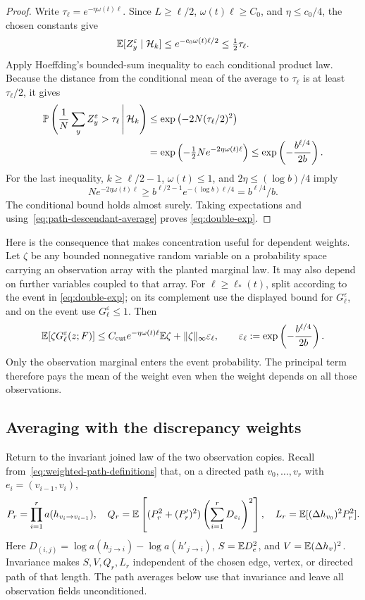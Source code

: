 \begin{proof}
Write $\tau_\ell=e^{-\eta\omega(t)\ell}$.  Since $L\ge\ell/2$,
$\omega(t)\ell\ge C_0$, and $\eta\le c_0/4$, the chosen constants
give
\[
 \E[Z_y^\varepsilon\mid\mathcal H_k]
       \le e^{-c_0\omega(t)\ell/2}\le\tfrac12\tau_\ell.
\]
Apply Hoeffding's bounded-sum inequality
\cite[Theorem~2]{Hoeffding1963} to each conditional product law.
Because the distance from the conditional mean of the average to
$\tau_\ell$ is at least $\tau_\ell/2$, it gives
\begin{align*}
 \P\left(\frac1N\sum_yZ_y^\varepsilon>\tau_\ell
              \,\middle|\,\mathcal H_k\right)
 &\le\exp\left(-2N(\tau_\ell/2)^2\right)\\
 &=\exp\left(-\tfrac12N e^{-2\eta\omega(t)\ell}\right)
 \le\exp\left(-\frac{b^{\ell/4}}{2b}\right).
\end{align*}
For the last inequality, $k\ge\ell/2-1$, $\omega(t)\le1$, and
$2\eta\le(\log b)/4$ imply
\[
 N e^{-2\eta\omega(t)\ell}
       \ge b^{\ell/2-1}e^{-(\log b)\ell/4}
       =b^{\ell/4}/b.
\]
The conditional bound holds almost surely.  Taking
expectations and using~\eqref{eq:path-descendant-average} proves
\eqref{eq:double-exp}.
\end{proof}

Here is the consequence that makes concentration useful for dependent
weights.  Let $\zeta$ be any bounded nonnegative random variable on a
probability space carrying an observation array with the planted
marginal law.  It may also depend on further variables coupled to that
array.  For $\ell\ge\ell_*(t)$, split according to the event in
\eqref{eq:double-exp}; on its complement use the displayed bound for
$G^\varepsilon_\ell$, and on the event use $G^\varepsilon_\ell\le1$.
Then
\begin{equation}
 \E[\zeta G^\varepsilon_\ell(z;F)]
 \le C_{\mathrm{cut}}e^{-\eta\omega(t)\ell}\E\zeta
       +\|\zeta\|_\infty\varepsilon_\ell,
 \qquad
 \varepsilon_\ell:=\exp\left(-\frac{b^{\ell/4}}{2b}\right).
 \label{eq:dependent-average-bound}
\end{equation}
Only the observation marginal enters the event probability.  The
principal term therefore pays the mean of the weight even when the
weight depends on all those observations.

\subsection{Averaging with the discrepancy weights}

Return to the invariant joined law of the two observation copies.
Recall from~\eqref{eq:weighted-path-definitions} that, on a directed
path $v_0,\ldots,v_r$ with $e_i=(v_{i-1},v_i)$,
\[
 P_r=\prod_{i=1}^r a(h_{v_i\to v_{i-1}}),\quad
 Q_r=\E\left[(P_r^2+(P'_r)^2)
                  \left(\sum_{i=1}^rD_{e_i}\right)^2\right],\quad
 L_r=\E[(\Delta h_{v_0})^2P_r^2].
\]
Here $D_{(i,j)}=\log a(h_{j\to i})-\log a(h'_{j\to i})$,
$S=\E D_e^2$, and $V=\E(\Delta h_v)^2$.  Invariance makes $S,V,Q_r,L_r$
independent of the chosen edge, vertex, or directed path of that
length.  The path averages below use that invariance and leave
all observation fields unconditioned.

